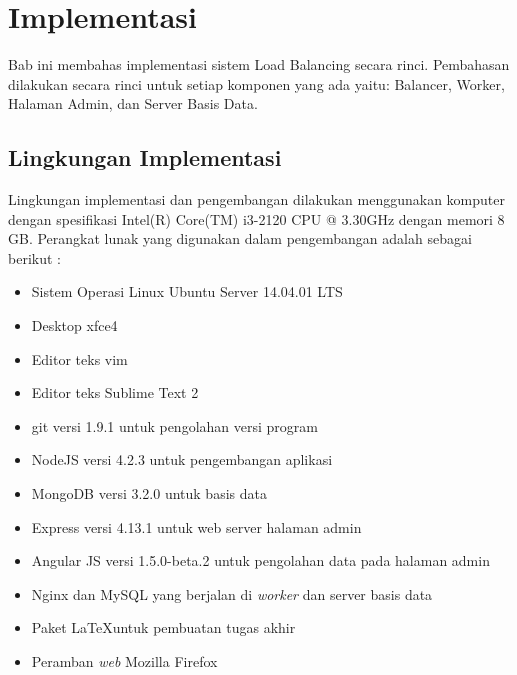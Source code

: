 \documentclass{ta-its}
\begin{document}
		         
		         
	\chapter{Implementasi}
        Bab ini membahas implementasi sistem Load Balancing secara rinci. Pembahasan dilakukan secara rinci untuk setiap komponen yang ada yaitu: Balancer, Worker, Halaman Admin, dan Server Basis Data.
        
        \section{Lingkungan Implementasi}
	        Lingkungan implementasi dan pengembangan dilakukan menggunakan komputer dengan spesifikasi Intel(R) Core(TM) i3-2120 CPU @ 3.30GHz dengan memori 8 GB. Perangkat lunak yang digunakan dalam pengembangan adalah sebagai berikut :
	        \begin{itemize}
	        	\item Sistem Operasi Linux Ubuntu Server 14.04.01 LTS
	        	\item Desktop xfce4
	        	\item Editor teks vim
	        	\item Editor teks Sublime Text 2
	        	\item git versi 1.9.1 untuk pengolahan versi program
	        	\item NodeJS versi 4.2.3 untuk pengembangan aplikasi
	        	\item MongoDB versi 3.2.0 untuk basis data
	        	\item Express versi 4.13.1 untuk web server halaman admin
	        	\item Angular JS versi 1.5.0-beta.2 untuk pengolahan data pada halaman admin
	        	\item Nginx dan MySQL yang berjalan di \textit{worker} dan server basis data
	        	\item Paket \LaTeX untuk pembuatan tugas akhir
	        	\item Peramban \textit{web} Mozilla Firefox
	        \end{itemize}
	        
\end{document}
